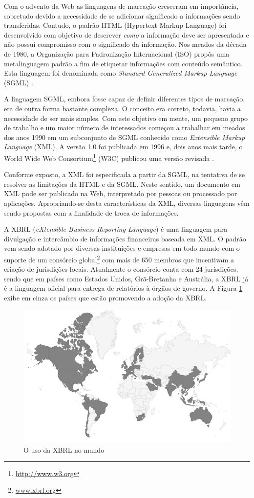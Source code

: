 \documentclass[msc,proposal,hidelot,hideabstract]{ppgccufmg} %
\begin{document}
Com o advento da Web as linguagens de marcação cresceram em importância, sobretudo devido a necessidade de se adicionar significado a informações sendo transferidas. Contudo, o padrão HTML (Hypertext
Markup Language) foi desenvolvido com objetivo de descrever \textit{como} a informação deve ser apresentada e não possui compromisso com o significado da informação. Nos meados da década de 1980,  a Organização para Padronização Internacional (ISO) propôs uma metalinguagem padrão a fim de etiquetar informações com conteúdo semântico. Esta linguagem foi denominada como \textit{Standard Generalized Markup Language} (SGML) \cite{smith1988sgml}.

A linguagem SGML, embora fosse capaz de definir diferentes tipos de marcação,
era de outra forma bastante complexa. O conceito era correto, todavia, havia a necessidade de ser mais simples. Com este objetivo em mente, um pequeno grupo de trabalho e um maior número de interessados começou a trabalhar em
meados dos anos 1990 em um subconjunto de SGML conhecido como \textit{Extensible Markup Language} (XML). A versão 1.0 foi publicada em 1996 e, dois anos mais tarde, o World Wide Web Consortium\footnote{\url{http://www.w3.org}} (W3C) publicou uma versão revisada \cite{Fawcett:2012:BX:2408362}{}.

Conforme exposto, a XML foi especificada a partir da SGML, na tentativa de se resolver as limitações da HTML
e da SGML. Neste sentido, um documento em XML pode ser publicado na Web, interpretado por pessoas
ou processado por aplicações. Apropriando-se desta características da XML, diversas linguagens vêm sendo propostas com a finalidade de troca de informações.

A XBRL (\textit{eXtensible Business Reporting Language}) é uma linguagem para
divulgação e intercâmbio de informações financeiras baseada em
XML\cite{xbrl_conceitos_aplicacoes}. O padrão vem sendo adotado por diversas
instituições e empresas em todo mundo com o suporte de um consórcio
global\footnote{\url{www.xbrl.org}} com mais de 650 membros que incentivam a
criação de jurisdições locais. Atualmente o consórcio conta com 24 jurisdições,
sendo que em países como  Estados Unidos, Grã-Bretanha e Austrália, a XBRL já é
a linguagem oficial para entrega de relatórios à órgãos de governo. A Figura
\ref{fig:world_map} exibe em cinza os países que estão promovendo a adoção da XBRL.

\begin{figure}[hbtp]
\centering
\includegraphics[width=.75\textwidth]{img/world-map.png}
\caption{O uso da XBRL no mundo}
\label{fig:world_map}
\end{figure}
\end{document}
